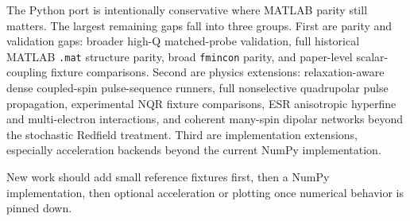 \documentclass[11pt,oneside]{report}
\newcommand{\code}[1]{\texttt{#1}}
\begin{document}
The Python port is intentionally conservative where MATLAB parity still matters.
The largest remaining gaps fall into three groups. First are parity and
validation gaps: broader high-Q matched-probe validation, full historical
MATLAB \code{.mat} structure parity, broad \code{fmincon} parity, and
paper-level scalar-coupling fixture comparisons. Second are physics extensions:
relaxation-aware dense coupled-spin pulse-sequence runners, full nonselective
quadrupolar pulse propagation, experimental NQR fixture comparisons, ESR
anisotropic hyperfine and multi-electron interactions, and coherent many-spin
dipolar networks beyond the stochastic Redfield treatment. Third are
implementation extensions, especially acceleration backends beyond the current
NumPy implementation.

New work should add small reference fixtures first, then a NumPy implementation,
then optional acceleration or plotting once numerical behavior is pinned down.
\end{document}
